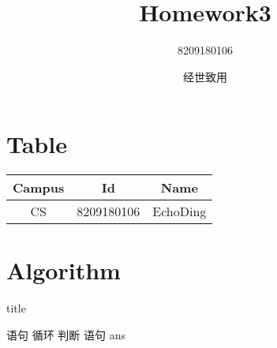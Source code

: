 \documentclass{article}
\title{Homework3}
\author{8209180106}
\date{经世致用}
\begin{document}
\maketitle

\section{Table}

\begin{tabular}{ccc}
\hline
Campus & Id & Name\\
\hline
CS& 8209180106 & EchoDing\\

\hline
\end{tabular}

\section{Algorithm}
\begin{algorithm} 
	\caption{title}     
	\begin{algorithmic}[1] 
	\Require  
    \Ensure   
    \State 语句   
    \For 循环
       \If 判断
   \State 语句
   \EndIf
   \EndFor
   \State\Return ans 
   \end{algorithmic} 
\end{algorithm} 
\end{document}
